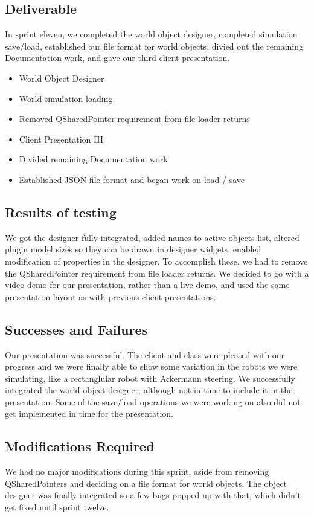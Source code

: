 \subsection{Deliverable}
In sprint eleven, we completed the world object designer, completed simulation save/load, established our file format for world objects, divied out the remaining Documentation work, and gave our third client presentation.

\begin{itemize}
	\item World Object Designer
	\item World simulation loading
	\item Removed QSharedPointer requirement from file loader returns
	\item Client Presentation III
	\item Divided remaining Documentation work
	\item Established JSON file format and began work on load / save
\end{itemize} 


\subsection{Results of testing}
We got the designer fully integrated, added names to active objects list, altered plugin model sizes so they can be drawn in designer widgets, enabled modification of properties in the designer. To accomplish these, we had to remove the QSharedPointer requirement from file loader returns. We decided to go with a video demo for our presentation, rather than a live demo, and used the same presentation layout as with previous client presentations.

\subsection{Successes and Failures}

Our presentation was successful. The client and class were pleased with our progress and we were finally able to show some variation in the robots we were simulating, like a rectanglular robot with Ackermann steering. We successfully integrated the world object designer, although not in time to include it in the presentation. Some of the save/load operations we were working on also did not get implemented in time for the presentation.

\subsection{Modifications Required}
We had no major modifications during this sprint, aside from removing QSharedPointers and deciding on a file format for world objects. The object designer was finally integrated so a few bugs popped up with that, which didn't get fixed until sprint twelve.

